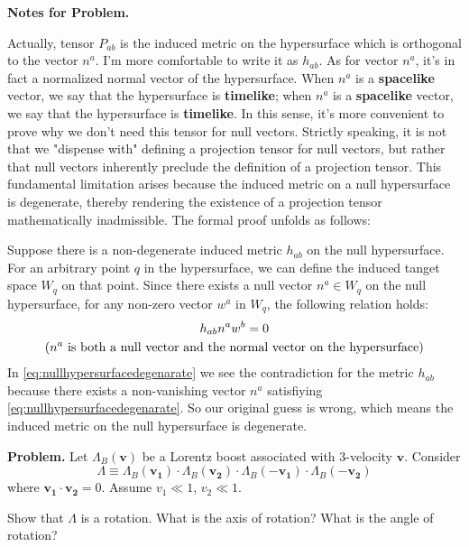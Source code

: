 \documentclass[12pt, a4paper, oneside]{article}
\newcounter{problemname}
\newenvironment{problem}{\begin{shaded}\stepcounter{problemname}\par\noindent\textbf{Problem\arabic{problemname}. }}{\end{shaded}\par}
\newenvironment{note}{\par\noindent\textbf{Notes for Problem\arabic{problemname}. }}{\par}
\renewcommand{\vb}[1]{\ensuremath{\mathbf{#1}}}
\begin{document}
\begin{note}

    Actually, tensor $P_{ab}$ is the induced metric on the hypersurface which is orthogonal to the vector $n^a$. I'm more comfortable to write it as $h_{ab}$. As for vector $n^a$, it's in fact a normalized normal vector of the hypersurface. When $n^a$ is a \textbf{spacelike} vector, we say that the hypersurface is \textbf{timelike}; when $n^a$ is a \textbf{spacelike} vector, we say that the hypersurface is \textbf{timelike}. In this sense, it's more convenient to prove why we don't need this tensor for null vectors.
    Strictly speaking, it is not that we "dispense with" defining a projection tensor for null vectors, but rather that null vectors inherently preclude the definition of a projection tensor. This fundamental limitation arises because the induced metric on a null hypersurface is degenerate, thereby rendering the existence of a projection tensor mathematically inadmissible. The formal proof unfolds as follows:

    Suppose there is a non-degenerate induced metric $h_{ab}$ on the null hypersurface. For an arbitrary point $q$ in the hypersurface, we can define the induced tanget space $W_q$ on that point. Since there exists a null vector $n^a\in W_q$ on the null hypersurface, for any non-zero vector $w^a$ in $W_q$, the following relation holds:
    \begin{gather}
        h_{ab} n^a w^b = 0\label{eq:nullhypersurfacedegenarate}\\
        \qty(n^a\text{ is both a null vector and the normal vector on the hypersurface})\nonumber
    \end{gather}
    In \cref{eq:nullhypersurfacedegenarate} we see the contradiction for the metric $h_{ab}$ because there exists a non-vanishing vector $n^a$ satisfiying \cref{eq:nullhypersurfacedegenarate}. So our original guess is wrong, which means the induced metric on the null hypersurface is degenerate.
\end{note}

\begin{problem}
    Let $\Lambda_B(\vb{v})$ be a Lorentz boost associated with 3-velocity \vb{v}. Consider
    \[\Lambda\equiv\Lambda_B(\vb{v_1})\cdot\Lambda_B(\vb{v_2})\cdot\Lambda_B(-\vb{v_1})\cdot\Lambda_B(-\vb{v_2})\]
    where $\vb{v_1}\cdot\vb{v_2}=0$. Assume $v_1\ll 1$, $v_2\ll 1$.

    Show that $\Lambda$ is a rotation. What is the axis of rotation? What is the angle of rotation?
\end{problem}
\end{document}

